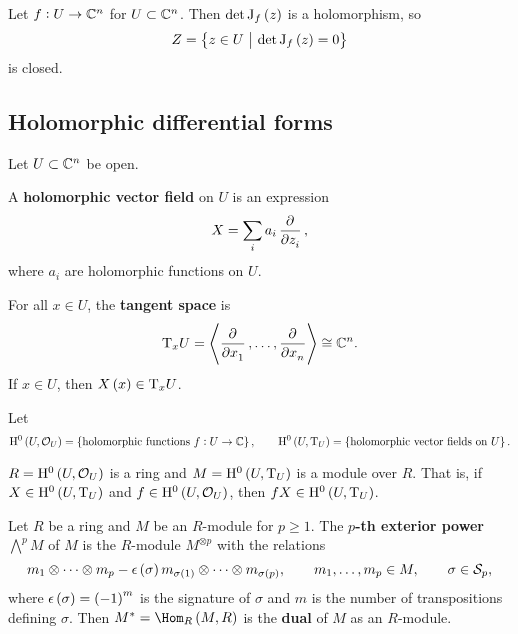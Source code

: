 \begin{remark}
Let $ f : U \to \mathbb{C}^n $ for $ U \subset \mathbb{C}^n $. Then $ \det \J_f\br{z} $ is a holomorphism, so
$$ Z = \cbr{z \in U \st \det \J_f\br{z} = 0} $$
is closed.
\end{remark}

\subsection{Holomorphic differential forms}

Let $ U \subset \mathbb{C}^n $ be open.

\begin{definition}
A \textbf{holomorphic vector field} on $ U $ is an expression
$$ X = \sum_i a_i\dpd{}{z_i}, $$
where $ a_i $ are holomorphic functions on $ U $.
\end{definition}

For all $ x \in U $, the \textbf{tangent space} is
$$ \T_xU = \abr{\dpd{}{x_1}, \dots, \dpd{}{x_n}} \cong \CC^n. $$
If $ x \in U $, then $ X\br{x} \in \T_xU $.

\begin{notation}
Let
$$ \H^0\br{U, \OOO_U} = \cbr{\text{holomorphic functions} \ f : U \to \CC}, \qquad \H^0\br{U, \T_U} = \cbr{\text{holomorphic vector fields on} \ U}. $$
\end{notation}

\begin{remark*}
$ R = \H^0\br{U, \OOO_U} $ is a ring and $ M = \H^0\br{U, \T_U} $ is a module over $ R $. That is, if $ X \in \H^0\br{U, \T_U} $ and $ f \in \H^0\br{U, \OOO_U} $, then $ fX \in \H^0\br{U, \T_U} $.
\end{remark*}

\pagebreak

\begin{definition}
Let $ R $ be a ring and $ M $ be an $ R $-module for $ p \ge 1 $. The \textbf{$ p $-th exterior power} $ \bigwedge^pM $ of $ M $ is the $ R $-module $ M^{\otimes p} $ with the relations
$$ m_1 \otimes \dots \otimes m_p - \epsilon\br{\sigma}m_{\sigma\br{1}} \otimes \dots \otimes m_{\sigma\br{p}}, \qquad m_1, \dots, m_p \in M, \qquad \sigma \in \SSS_p, $$
where $ \epsilon\br{\sigma} = \br{-1}^m $ is the signature of $ \sigma $ and $ m $ is the number of transpositions defining $ \sigma $. Then $ M^* = \Hom_R\br{M, R} $ is the \textbf{dual} of $ M $ as an $ R $-module.
\end{definition}


